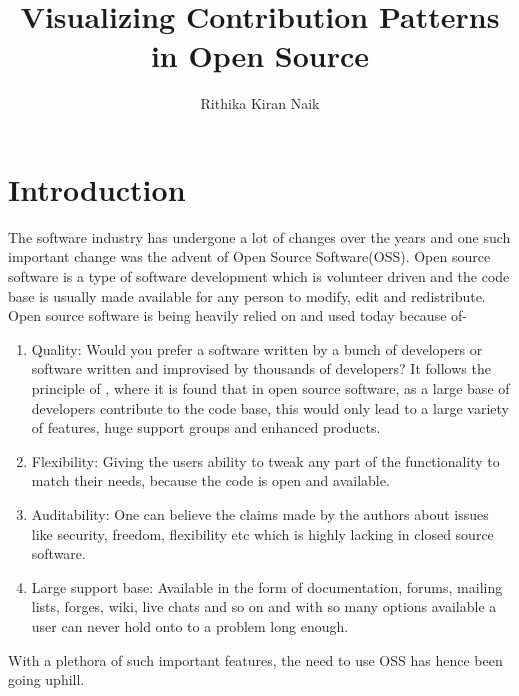 \documentclass[seploa]{beavtex}
\title{Visualizing Contribution Patterns in Open Source}
\author{Rithika Kiran Naik}
\begin{document}
\maketitle

\mainmatter

\chapter{Introduction}
The software industry has undergone a lot of changes over the years and one such important change was the advent of Open Source Software(OSS). Open source software is a type of software development which is volunteer driven\cite{ghosh2005} and the code base is usually made available for any person to modify, edit and redistribute\cite{osdef}. Open source software is being heavily relied on and used today because of-
\begin{enumerate}
\item Quality: Would you prefer a software written by a bunch of developers or software written and improvised by thousands of developers? It follows the principle of \cite{linuslaw}, where it is found that in open source software, as a large base of developers contribute to the code base, this would only lead to a large variety of features, huge support groups and enhanced products\cite{pcwr}. 
\item Flexibility: Giving the users ability to tweak any part of the functionality to match their needs, because the code is open and available\cite{pcwr}. 
\item Auditability: One can believe the claims made by the authors about issues like security, freedom, flexibility etc which is highly lacking in closed source software\cite{pcwr}. 
\item Large support base: Available in the form of documentation, forums, mailing lists, forges, wiki, live chats and so on and with so many options available a user can never hold onto to a problem long enough. 
\end{enumerate}
With a plethora of such important features, the need to use OSS has hence been going uphill.
\end{document}
